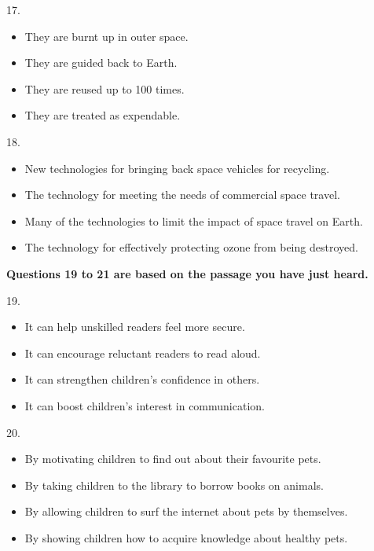 \documentclass[UTF8,11pt]{ctexart}
\begin{document}
17.


\begin{itemize}[leftmargin=2em,itemsep=.2em,topsep=.4em]\item[A.] They are burnt up in outer space.
\item[B.] They are guided back to Earth.
\item[C.] They are reused up to 100 times.
\item[D.] They are treated as expendable.
\end{itemize}

18.


\begin{itemize}[leftmargin=2em,itemsep=.2em,topsep=.4em]\item[A.] New technologies for bringing back space vehicles for recycling.
\end{itemize}

\begin{itemize}[leftmargin=2em,itemsep=.2em,topsep=.4em]\item[B.] The technology for meeting the needs of commercial space travel.
\item[C.] Many of the technologies to limit the impact of space travel on Earth.
\item[D.] The technology for effectively protecting ozone from being destroyed.
\end{itemize}

\textbf{Questions 19 to 21 are based on the passage you have just heard.}


19.


\begin{itemize}[leftmargin=2em,itemsep=.2em,topsep=.4em]\item[A.] It can help unskilled readers feel more secure.
\item[B.] It can encourage reluctant readers to read aloud.
\item[C.] It can strengthen children’s confidence in others.
\item[D.] It can boost children’s interest in communication.
\end{itemize}

20.


\begin{itemize}[leftmargin=2em,itemsep=.2em,topsep=.4em]\item[A.] By motivating children to find out about their favourite pets.
\item[B.] By taking children to the library to borrow books on animals.
\item[C.] By allowing children to surf the internet about pets by themselves.
\item[D.] By showing children how to acquire knowledge about healthy pets.
\end{itemize}
\end{document}
